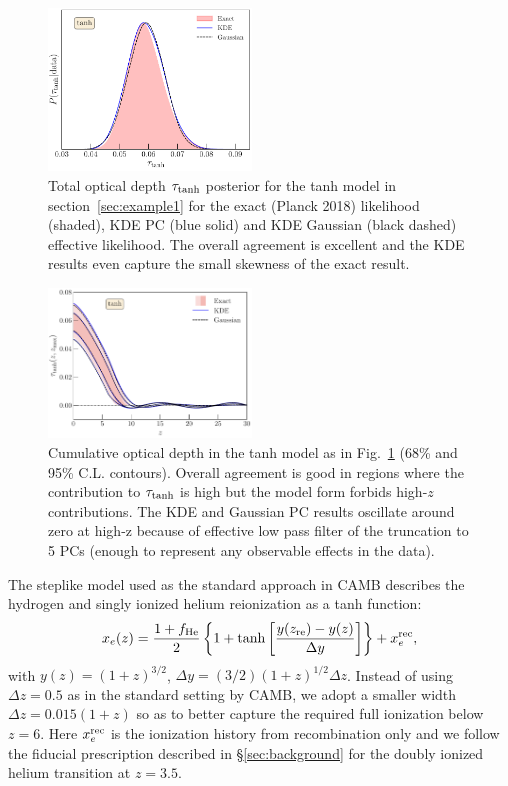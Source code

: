 \documentclass[prd,twocolumn,amsmath,amssymb,floatfix,superscriptaddress,nofootinbib]{revtex4-1}
\newcommand{\refsec}[1]{section~\ref{sec:#1}}
\begin{document}
\begin{figure}
\includegraphics[width=0.48\textwidth]
{paper/plots/pl18_tau_posterior_tanh_vs_tanh_kde_vs_tanh_gaussian_dz_auto_zre_prior_6p1_normalized_by_max.pdf}
\caption{Total optical depth $\tau_{\rm tanh}$ posterior for the tanh model in \refsec{example1} for the exact (Planck 2018) likelihood (shaded), KDE PC 
(blue solid) and KDE Gaussian (black dashed)
effective likelihood. The overall agreement is excellent and the KDE results even capture the small skewness of the exact result.
}
\label{fig:tanh}

\end{figure}


\begin{figure}[ht]
\includegraphics[width=0.48\textwidth]{paper/plots/pl18_taugtz_tanh_direct_vs_kde_vs_gaussian.pdf}
\caption{Cumulative optical depth in the tanh model as in Fig.~\ref{fig:tanh}
(68\% and 95\% C.L. contours).  Overall agreement is good in regions where the contribution to $\tau_{\rm tanh}$ is high but the model form forbids high-$z$ contributions.   The KDE and Gaussian PC results  oscillate around zero at high-z because of effective low pass filter of the truncation to 5 PCs (enough to represent any observable effects in the data). }
\label{fig:plot_taugtz_PC_vs_tanh}
\end{figure}

The steplike model used as the standard approach in CAMB describes the hydrogen and singly ionized helium reionization as a tanh function:
%
 \begin{equation}
x_e(z) = \frac{1+f_{\rm He}}{2}\left\{  1+ \tanh\left[ \frac{y(z_{\rm re})-y(z)}{\Delta y} \right] \right\} + x_e^{\rm rec},
 \label{eqn:tanh_1D}
 \end{equation}
 with $y(z)=(1+z)^{3/2}$, $\Delta y=(3/2)(1+z)^{1/2}\Delta z$. Instead of using $\Delta z = 0.5$ as in the standard setting by CAMB, we adopt a smaller width $\Delta z = 0.015(1+z)$ so as to better capture the required full ionization below $z=6$. Here $x_e^{\rm rec}$ is the ionization history from recombination only and we follow the fiducial prescription described in \S \ref{sec:background} for the 
 doubly ionized helium transition at $z=3.5$.
 
\end{document}
